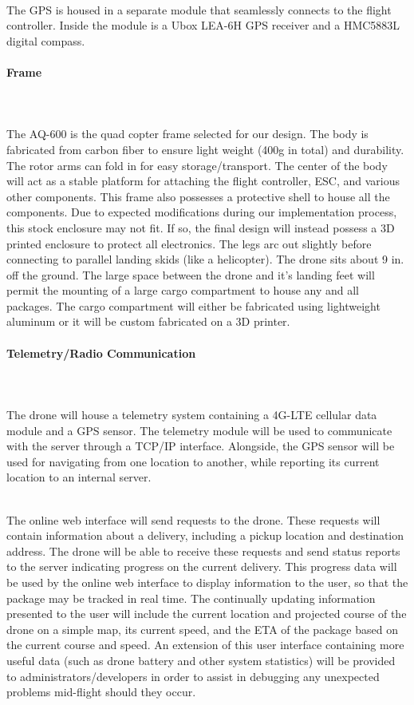 \documentclass[12pt]{extarticle}
\begin{document}
\ \\
The GPS is housed in a separate module that seamlessly connects to the flight controller. Inside the module is a Ubox LEA-6H GPS receiver and a HMC5883L digital compass.  

\paragraph{Frame}
\vspace{-3mm}
\ \\
\ \\
The AQ-600 is the quad copter frame selected for our design. The body is fabricated from carbon fiber to ensure light weight (400g in total) and durability. The rotor arms can fold in for easy storage/transport. The center of the body will act as a stable platform for attaching the flight controller, ESC, and various other components. This frame also possesses a protective shell to house all the components.  Due to expected modifications during our implementation process, this stock enclosure may not fit.  If so, the final design will instead possess a 3D printed enclosure to protect all electronics. The legs arc out slightly before connecting to parallel landing skids (like a helicopter).  The drone sits about 9 in. off the ground.  The large space between the drone and it's landing feet will permit the mounting of a large cargo compartment to house any and all packages.  The cargo compartment will either be fabricated using lightweight aluminum or it will be custom fabricated on a 3D printer.   

\paragraph{Telemetry/Radio Communication}
\vspace{-3mm}
\ \\
\ \\
The drone will house a telemetry system containing a 4G-LTE cellular data module and a GPS sensor. The telemetry module will be used to communicate with the server through a TCP/IP interface.  Alongside, the GPS sensor will be used for navigating from one location to another, while reporting its current location to an internal server.    

\ \\
The online web interface will send requests to the drone. These requests will contain information about a delivery, including a pickup location and destination address. The drone will be able to receive these requests and send status reports to the server indicating progress on the current delivery.  This progress data will be used by the online web interface to display information to the user, so that the package may be tracked in real time.  The continually updating information presented to the user will include the current location and projected course of the drone on a simple map, its current speed, and the ETA of the package based on the current course and speed.  An extension of this user interface containing more useful data (such as drone battery and other system statistics) will be provided to administrators/developers in order to assist in debugging any unexpected problems mid-flight should they occur.  
\end{document}
